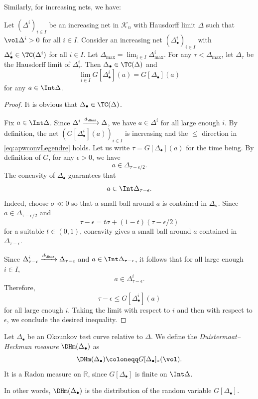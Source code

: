 Similarly, for increasing nets, we have:
\begin{proposition}\label{prop:incnetLegend}
    Let $(\Delta^i)_{i\in I}$ be an increasing net in $\mathcal{K}_n$ with Hausdorff limit $\Delta$ such that $\vol \Delta^i>0$ for all $i\in I$. Consider an increasing net $(\Delta^i_{\bullet})_{i\in I}$ with $\Delta^i_{\bullet}\in \TC(\Delta^i)$ for all $i\in I$.
    Let $\Delta_{\max}=\lim_{i\in I}\Delta^i_{\max}$. For any $\tau<\Delta_{\max}$, let $\Delta_{\tau}$ be the Hausdorff limit of $\Delta^i_{\tau}$. Then $\Delta_{\bullet}\in \TC(\Delta)$ and
    \begin{equation}\label{eq:apwconvLegendre}
    \lim_{i\in I}G[\Delta^i_{\bullet}](a)=G[\Delta_{\bullet}](a)
    \end{equation}
    for any $a\in \Int \Delta$.
\end{proposition}
\begin{proof}
    It is obvious that $\Delta_{\bullet}\in \TC(\Delta)$.

    Fix $a\in \Int \Delta$. Since $\Delta^i\xrightarrow{d_{\Haus}}\Delta$, we have $a\in \Delta^i$ for all large enough $i$.
    By definition, the net $(G[\Delta^i_{\bullet}](a))_{i\in I}$ is increasing and the $\leq$ direction in \eqref{eq:apwconvLegendre} holds.
    Let us write $\tau=G[\Delta_{\bullet}](a)$ for the time being.
    By definition of $G$, for any $\epsilon>0$, we have
    \[
    a\in \Delta_{\tau-\epsilon/2}.
    \]
    The concavity of $\Delta_{\bullet}$ guarantees that
    \[
    a\in \Int \Delta_{\tau-\epsilon}.
    \]
    Indeed, choose $\sigma\ll 0$ so that a small ball around $a$ is contained in $\Delta_\sigma$. Since $a\in\Delta_{\tau-\epsilon/2}$ and
    \[
        \tau-\epsilon=t\sigma+(1-t)(\tau-\epsilon/2)
    \]
    for a suitable $t\in(0,1)$, concavity gives a small ball around $a$ contained in $\Delta_{\tau-\epsilon}$.


    Since $\Delta^i_{\tau-\epsilon}\xrightarrow{d_{\Haus}}\Delta_{\tau-\epsilon}$ and $a\in \Int \Delta_{\tau-\epsilon}$, it follows that for all large enough $i\in I$,
    \[
    a\in \Delta^i_{\tau-\epsilon}.
    \]
    Therefore,
    \[
    \tau-\epsilon\leq G[\Delta^i_{\bullet}](a)
    \]
    for all large enough $i$. Taking the limit with respect to $i$ and then with respect to $\epsilon$, we conclude the desired inequality.
\end{proof}

\begin{definition}\label{def:DHmeasureOTC}
	Let $\Delta_{\bullet}$ be an Okounkov test curve relative to $\Delta$. We define the \emph{Duistermaat--Heckman measure} $\DHm(\Delta_{\bullet})$\index{$\DHm(\Delta_{\bullet})$} as
	\[
		\DHm(\Delta_{\bullet})\coloneqq G[\Delta_{\bullet}]_*(\vol).
	\]
	It is a Radon measure on $\mathbb{R}$, since $G[\Delta_{\bullet}]$ is finite on $\Int \Delta$.
\end{definition}
In other words, $\DHm(\Delta_{\bullet})$ is the distribution of the random variable $G[\Delta_{\bullet}]$.

